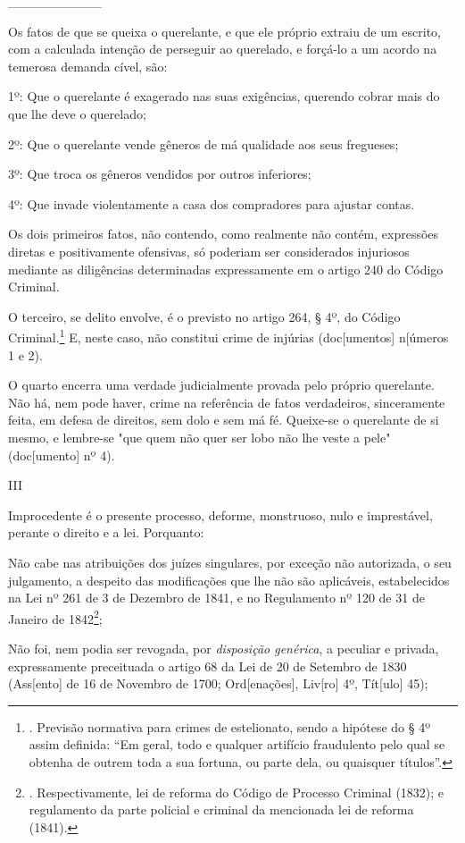 \_\_\_\_\_\_\_\_\_\_

Os fatos de que se queixa o querelante, e que ele próprio extraiu de um
escrito, com a calculada intenção de perseguir ao querelado, e forçá-lo
a um acordo na temerosa demanda cível, são:

1º: Que o querelante é exagerado nas suas exigências, querendo cobrar
mais do que lhe deve o querelado;

2º: Que o querelante vende gêneros de má qualidade aos seus fregueses;

3º: Que troca os gêneros vendidos por outros inferiores;

4º: Que invade violentamente a casa dos compradores para ajustar contas.

Os dois primeiros fatos, não contendo, como realmente não contém,
expressões diretas e positivamente ofensivas, só poderiam ser
considerados injuriosos mediante as diligências determinadas
expressamente em o artigo 240 do Código Criminal.

O terceiro, se delito envolve, é o previsto no artigo 264, § 4º, do
Código Criminal.\footnote{. Previsão normativa para crimes de
  estelionato, sendo a hipótese do § 4º assim definida: ``Em geral, todo
  e qualquer artifício fraudulento pelo qual se obtenha de outrem toda a
  sua fortuna, ou parte dela, ou quaisquer títulos''.} E, neste caso,
não constitui crime de injúrias (doc{[}umentos{]} n{[}úmeros 1 e 2).

O quarto encerra uma verdade judicialmente provada pelo próprio
querelante. Não há, nem pode haver, crime na referência de fatos
verdadeiros, sinceramente feita, em defesa de direitos, sem dolo e sem
má fé. Queixe-se o querelante de si mesmo, e lembre-se "que quem não
quer ser lobo não lhe veste a pele" (doc{[}umento{]} nº 4).

III

Improcedente é o presente processo, deforme, monstruoso, nulo e
imprestável, perante o direito e a lei. Porquanto:

Não cabe nas atribuições dos juízes singulares, por exceção não
autorizada, o seu julgamento, a despeito das modificações que lhe não
são aplicáveis, estabelecidos na Lei nº 261 de 3 de Dezembro de 1841, e
no Regulamento nº 120 de 31 de Janeiro de 1842\footnote{.
  Respectivamente, lei de reforma do Código de Processo Criminal (1832);
  e regulamento da parte policial e criminal da mencionada lei de
  reforma (1841).};

Não foi, nem podia ser revogada, por \emph{disposição genérica}, a
peculiar e privada, expressamente preceituada o artigo 68 da Lei de 20
de Setembro de 1830 (Ass{[}ento{]} de 16 de Novembro de 1700;
Ord{[}enações{]}, Liv{[}ro{]} 4º, Tít{[}ulo{]} 45);

